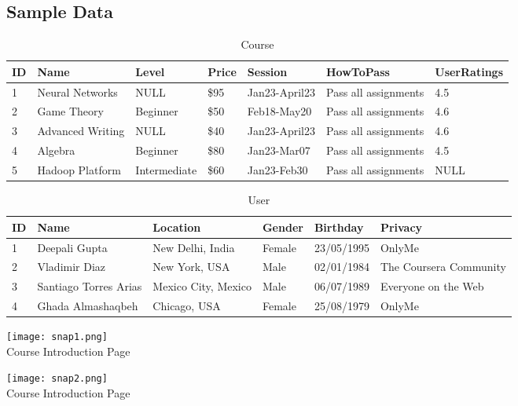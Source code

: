 \documentclass[10pt]{article}
\begin{document}
\subsection{Sample Data}
\begin{table}[h!]
\centering
\caption{Course}
  \label{tab:table2}
  \vspace{5mm}
  \begin{tabular}{|p{1cm}|p{1.5cm}|p{2cm}|p{1cm}|p{2.5cm}|p{3cm}|p{2cm}|}
  \hline
  ID & Name & Level & Price & Session & HowToPass & UserRatings\\ 
  \hline
  1 & Neural Networks & NULL & \$95 & Jan23-April23 & Pass all assignments & 4.5\\
  \hline
  2 & Game Theory & Beginner & \$50 & Feb18-May20 & Pass all assignments & 4.6\\
  \hline
  3 & Advanced Writing & NULL & \$40 & Jan23-April23 & Pass all assignments & 4.6\\
  \hline
  4 & Algebra & Beginner & \$80 & Jan23-Mar07 & Pass all assignments & 4.5\\
  \hline
  5 & Hadoop Platform & Intermediate & \$60 & Jan23-Feb30 & Pass all assignments & NULL\\
  \hline
  \end{tabular}
\end{table}
\begin{table}[h!]
\centering
\caption{User}
  \label{tab:table4}
  \vspace{5mm}
  \begin{tabular}{|p{1cm}|p{3cm}|p{3cm}|p{2cm}|p{2cm}|p{4cm}|}
  \hline
  ID & Name & Location & Gender & Birthday & Privacy\\
  \hline
  1 & Deepali Gupta & New Delhi, India & Female & 23/05/1995 & OnlyMe\\
  \hline
  2 & Vladimir Diaz & New York, USA & Male & 02/01/1984 & The Coursera Community\\
  \hline
  3 & Santiago Torres Arias & Mexico City, Mexico & Male & 06/07/1989 & Everyone on the Web\\
 \hline
 4 & Ghada Almashaqbeh & Chicago, USA & Female & 25/08/1979 & OnlyMe\\
 \hline
  \end{tabular}
\end{table}
\begin{center}
\texttt{[image: snap1.png]}{\\Course Introduction Page}
\end{center}
\begin{center}
\texttt{[image: snap2.png]}{\\Course Introduction Page}
\end{center}
\end{document}
